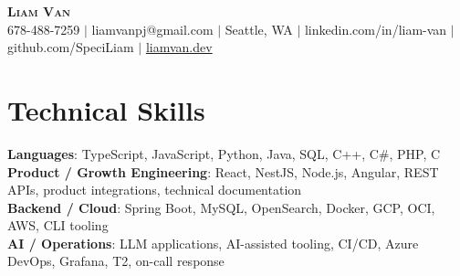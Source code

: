 \documentclass[letterpaper,11pt]{article}
\begin{document}

%
\begin{center}
    \textbf{\Huge \scshape Liam Van} \\ \vspace{1pt}
    \small 678-488-7259 $|$ \small {liamvanpj@gmail.com} $|$ Seattle, WA
 {{$|$ linkedin.com/in/liam-van} {$|$ github.com/SpeciLiam} {$|$ \href{https://liamvan.dev}{liamvan.dev}}}

\end{center}

\section{Technical Skills}
 \begin{itemize}[leftmargin=0.15in, label={}]
    \small{\item{
     \textbf{Languages}{: TypeScript, JavaScript, Python, Java, SQL, C++, C\#, PHP, C} \\
     \textbf{Product / Growth Engineering}{: React, NestJS, Node.js, Angular, REST APIs, product integrations, technical documentation} \\
     \textbf{Backend / Cloud}{: Spring Boot, MySQL, OpenSearch, Docker, GCP, OCI, AWS, CLI tooling} \\
     \textbf{AI / Operations}{: LLM applications, AI-assisted tooling, CI/CD, Azure DevOps, Grafana, T2, on-call response} \\
    }}
 \end{itemize}
%

\end{document}
